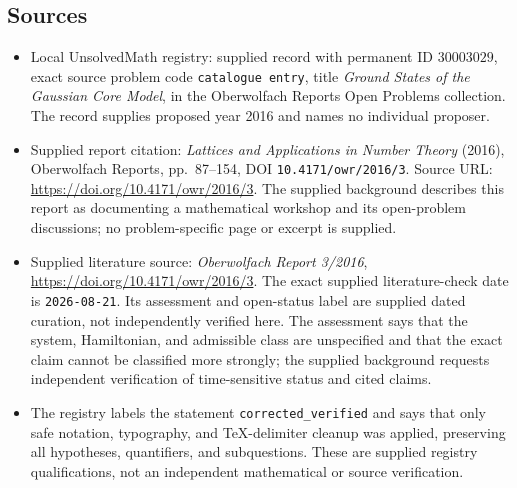 \documentclass[11pt]{article}
\begin{document}
\subsection{Sources}
\begin{itemize}
\item Local UnsolvedMath registry: supplied record with permanent ID \(30003029\), exact source problem code \texttt{catalogue entry}, title \emph{Ground States of the Gaussian Core Model}, in the Oberwolfach Reports Open Problems collection. The record supplies proposed year 2016 and names no individual proposer.
\item Supplied report citation: \emph{Lattices and Applications in Number Theory} (2016), Oberwolfach Reports, pp.\ 87--154, DOI \texttt{10.4171/owr/2016/3}. Source URL: \url{https://doi.org/10.4171/owr/2016/3}. The supplied background describes this report as documenting a mathematical workshop and its open-problem discussions; no problem-specific page or excerpt is supplied.
\item Supplied literature source: \emph{Oberwolfach Report 3/2016}, \url{https://doi.org/10.4171/owr/2016/3}. The exact supplied literature-check date is \texttt{2026-08-21}. Its assessment and open-status label are supplied dated curation, not independently verified here. The assessment says that the system, Hamiltonian, and admissible class are unspecified and that the exact claim cannot be classified more strongly; the supplied background requests independent verification of time-sensitive status and cited claims.
\item The registry labels the statement \texttt{corrected\_verified} and says that only safe notation, typography, and TeX-delimiter cleanup was applied, preserving all hypotheses, quantifiers, and subquestions. These are supplied registry qualifications, not an independent mathematical or source verification.
\end{itemize}
\end{document}
